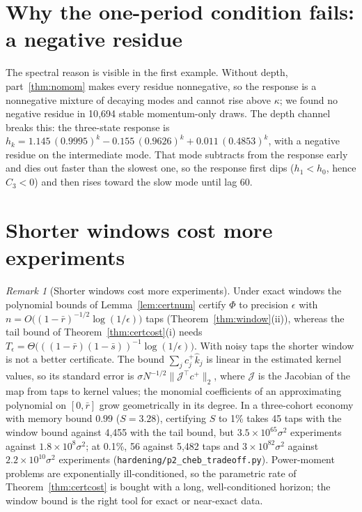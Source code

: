 \documentclass[12pt]{article}
\theoremstyle{definition}
\theoremstyle{remark}
\newtheorem{remark}[theorem]{Remark}
\begin{document}
\section{Why the one-period condition fails: a negative residue}
The spectral reason is visible in the first example. Without depth, part~\ref{thm:nomom} makes every residue nonnegative, so the response is a nonnegative mixture of decaying modes and cannot rise above $\kappa$; we found no negative residue in 10{,}694 stable momentum-only draws. The depth channel breaks this: the three-state response is $h_k=1.145\,(0.9995)^k-0.155\,(0.9626)^k+0.011\,(0.4853)^k$, with a negative residue on the intermediate mode. That mode subtracts from the response early and dies out faster than the slowest one, so the response first dips ($h_1<h_0$, hence $C_3<0$) and then rises toward the slow mode until lag 60.
\section{Shorter windows cost more experiments}
\begin{remark}[Shorter windows cost more experiments]\label{rem:cheb}
Under exact windows the polynomial bounds of Lemma~\ref{lem:certnum} certify $\Phi$ to precision $\epsilon$ with $n=O\bigl((1-\bar r)^{-1/2}\log(1/\epsilon)\bigr)$ taps (Theorem~\ref{thm:window}(ii)), whereas the tail bound of Theorem~\ref{thm:certcost}(i) needs $T_\epsilon=\Theta\bigl(((1-\bar r)(1-\bar s))^{-1}\log(1/\epsilon)\bigr)$. With noisy taps the shorter window is not a better certificate. The bound $\sum_jc^+_j\hat k_j$ is linear in the estimated kernel values, so its standard error is $\sigma N^{-1/2}\|\mathcal J^\top c^+\|_2$, where $\mathcal J$ is the Jacobian of the map from taps to kernel values; the monomial coefficients of an approximating polynomial on $[0,\bar r]$ grow geometrically in its degree. In a three-cohort economy with memory bound $0.99$ ($S=3.28$), certifying $S$ to 1\% takes 45 taps with the window bound against 4{,}455 with the tail bound, but $3.5\times10^{65}\sigma^2$ experiments against $1.8\times10^{8}\sigma^2$; at 0.1\%, 56 against 5{,}482 taps and $3\times10^{82}\sigma^2$ against $2.2\times10^{10}\sigma^2$ experiments (\texttt{hardening/p2\_cheb\_tradeoff.py}). Power-moment problems are exponentially ill-conditioned, so the parametric rate of Theorem~\ref{thm:certcost} is bought with a long, well-conditioned horizon; the window bound is the right tool for exact or near-exact data.
\end{remark}
\end{document}
